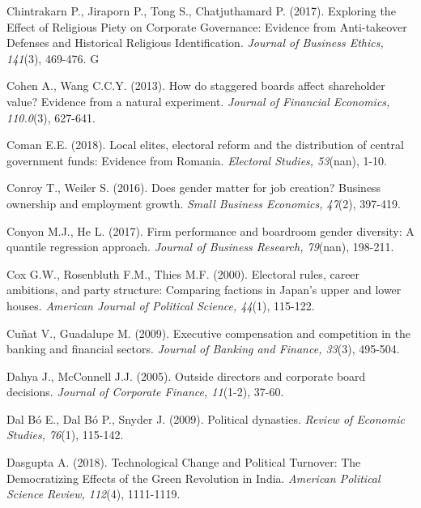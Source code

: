 \documentclass[english]{article}
\begin{document}
\begin{singlespace}
\begin{list}{}{\setlength\itemindent{-\leftmargin}}
\item *Chintrakarn P., Jiraporn P., Tong S., Chatjuthamard P. (2017).  Exploring the Effect of Religious Piety on Corporate Governance: Evidence from Anti-takeover Defenses and Historical Religious Identification. \emph{Journal of Business Ethics, 141}(3), 469-476. G

\item *Cohen A., Wang C.C.Y. (2013). How do staggered boards affect shareholder value? Evidence from a natural experiment. \emph{Journal of Financial Economics, 110.0}(3), 627-641.

\item *Coman E.E. (2018). Local elites, electoral reform and the distribution of central government funds: Evidence from Romania. \emph{Electoral Studies, 53}(nan), 1-10.

\item *Conroy T., Weiler S. (2016). Does gender matter for job creation?  Business ownership and employment growth. \emph{Small Business Economics, 47}(2), 397-419.

\item *Conyon M.J., He L. (2017). Firm performance and boardroom gender diversity: A quantile regression approach. \emph{Journal of Business Research, 79}(nan), 198-211.

\item *Cox G.W., Rosenbluth F.M., Thies M.F. (2000). Electoral rules, career ambitions, and party structure: Comparing factions in Japan's upper and lower houses. \emph{American Journal of Political Science, 44}(1), 115-122.

\item *Cuñat V., Guadalupe M. (2009). Executive compensation and competition in the banking and financial sectors. \emph{Journal of Banking and Finance, 33}(3), 495-504.

\item *Dahya J., McConnell J.J. (2005). Outside directors and corporate board decisions. \emph{Journal of Corporate Finance, 11}(1-2), 37-60.

\item *Dal Bó E., Dal Bó P., Snyder J. (2009). Political dynasties.  \emph{Review of Economic Studies, 76}(1), 115-142.

\item *Dasgupta A. (2018). Technological Change and Political Turnover: The Democratizing Effects of the Green Revolution in India. \emph{American Political Science Review, 112}(4), 1111-1119.


\end{list}
\end{singlespace}
\end{document}
